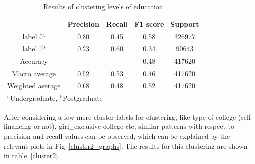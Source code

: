 \begin{table}[htbp]
    \caption{Results of clustering levels of education}
    \label{cluster1}
    \begin{center}
    \begin{tabular}{|c|c|c|c|c|}
    \hline
     
     & \textbf{Precision}& \textbf{Recall}& \textbf{F1 score} & \textbf{Support}  \\
    \hline
    
    label 0$^{\mathrm{a}}$ & 0.80 & 0.45 & 0.58 & 326977 \\\hline
    label 1$^{\mathrm{b}}$ & 0.23 & 0.60 & 0.34 & 90643 \\\hline
    Accuracy &  &  & 0.48 & 417620 \\\hline
    Macro average & 0.52 & 0.53 & 0.46 & 417620 \\\hline
    Weighted average & 0.68 & 0.48 & 0.52 & 417620 \\

    \hline

    \multicolumn{4}{l}{$^{\mathrm{a}}$Undergraduate, $^{\mathrm{b}}$Postgraduate}
    \end{tabular}
    \end{center}
\end{table}


After considering a few more cluster labels for clustering, like type of college (self financing or not), girl\_exclusive college etc, similar patterns with respect to precision and recall values can be observed, which can be explained by the relevant plots in Fig~\ref{cluster2_graphs}. The results for this clustering are shown in table~\ref{cluster2}.


